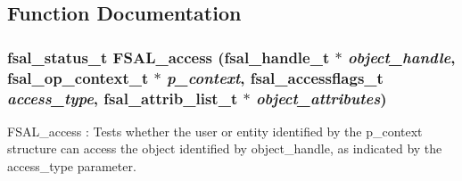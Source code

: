 \subsection{Function Documentation}
\subsubsection{\setlength{\rightskip}{0pt plus 5cm}fsal\_\-status\_\-t FSAL\_\-access (fsal\_\-handle\_\-t $\ast$ {\em object\_\-handle}, fsal\_\-op\_\-context\_\-t $\ast$ {\em p\_\-context}, fsal\_\-accessflags\_\-t {\em access\_\-type}, fsal\_\-attrib\_\-list\_\-t $\ast$ {\em object\_\-attributes})}\label{fsal__access_8c_a0}


FSAL\_\-access : Tests whether the user or entity identified by the p\_\-context structure can access the object identified by object\_\-handle, as indicated by the access\_\-type parameter.

